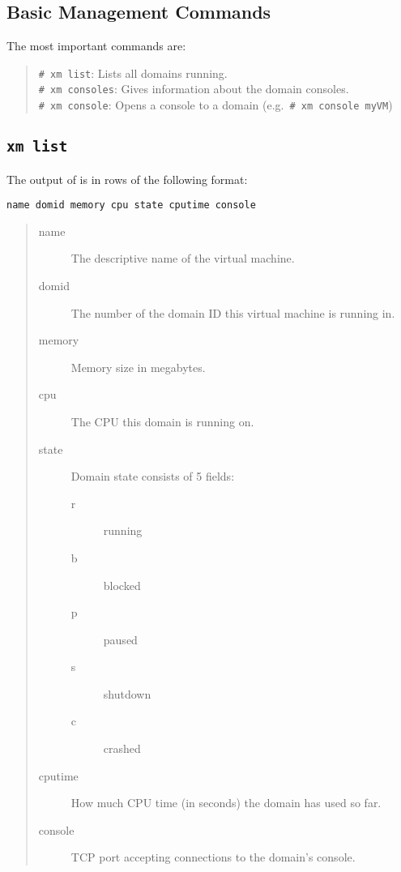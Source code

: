 \subsection{Basic Management Commands}

The most important  commands are:
\begin{quote}
  \verb_# xm list_: Lists all domains running.\\
  \verb_# xm consoles_: Gives information about the domain consoles.\\
  \verb_# xm console_: Opens a console to a domain (e.g.\
  \verb_# xm console myVM_)
\end{quote}

\subsection{\tt xm list}

The output of  is in rows of the following format:
\begin{center} {\tt name domid memory cpu state cputime console}
\end{center}

\begin{quote}
  \begin{description}
  \item[name] The descriptive name of the virtual machine.
  \item[domid] The number of the domain ID this virtual machine is
    running in.
  \item[memory] Memory size in megabytes.
  \item[cpu] The CPU this domain is running on.
  \item[state] Domain state consists of 5 fields:
    \begin{description}
    \item[r] running
    \item[b] blocked
    \item[p] paused
    \item[s] shutdown
    \item[c] crashed
    \end{description}
  \item[cputime] How much CPU time (in seconds) the domain has used so
    far.
  \item[console] TCP port accepting connections to the domain's
    console.
  \end{description}
\end{quote}

